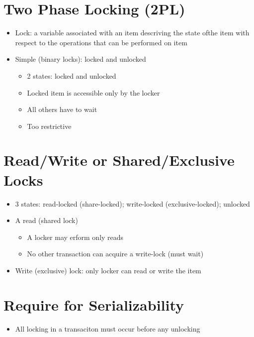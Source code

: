 \documentclass[12pt]{article}
\begin{document}
		\section*{Two Phase Locking (2PL)}
		\begin{itemize}
			\item
				Lock: a variable associated with an item descriving the state ofthe item with respect to the operations that can be performed on item
			\item
				Simple (binary locks): locked and unlocked
				\begin{itemize}
					\item
						2 states: locked and unlocked
					\item
						Locked item is accessible only by the locker
					\item
						All others have to wait
					\item
						Too restrictive
				\end{itemize}
		\end{itemize}
		\section*{Read/Write or Shared/Exclusive Locks}
		\begin{itemize}
			\item
				3 states: read-locked (share-locked); write-locked (exclusive-locked); unlocked
			\item
				A read (shared lock)
				\begin{itemize}
					\item
						A locker may erform only reads
					\item
						No other transaction can acquire a write-lock (must wait)
				\end{itemize}
			\item
				Write (exclusive) lock: only locker can read or write the item
		\end{itemize}
		\section*{Require for Serializability}
		\begin{itemize}
			\item
				All locking in a transaciton must occur before any unlocking
		\end{itemize}
\end{document}
